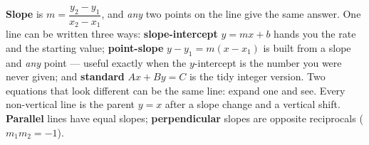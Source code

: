 \documentclass[10pt]{article}
\begin{document}
\vspace{0.10in}

\begin{remindbox}
\small \textbf{Slope} is $m=\dfrac{y_2-y_1}{x_2-x_1}$, and \emph{any} two points on the line give the
same answer. One line can be written three ways: \textbf{slope-intercept} $y=mx+b$ hands you the rate
and the starting value; \textbf{point-slope} $y-y_1=m(x-x_1)$ is built from a slope and \emph{any}
point --- useful exactly when the $y$-intercept is the number you were never given; and
\textbf{standard} $Ax+By=C$ is the tidy integer version. Two equations that look different can be the
same line: expand one and see. Every non-vertical line is the parent $y=x$ after a slope change and a
vertical shift. \textbf{Parallel} lines have equal slopes; \textbf{perpendicular} slopes are opposite
reciprocals ($m_1m_2=-1$).
\end{remindbox}
\end{document}
